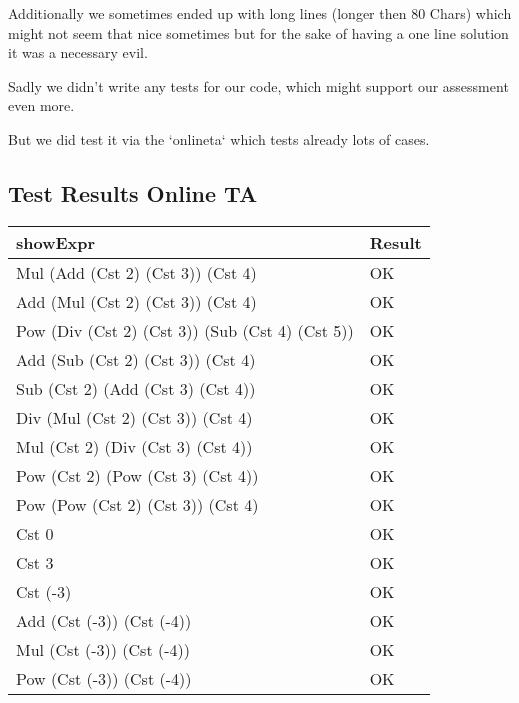 \documentclass[12pt,a4paper]{article}
\begin{document}
Additionally we sometimes ended up with long lines (longer then 80 Chars) which might not seem that nice sometimes but for the sake of having a one line solution it was a necessary evil.

Sadly we didn't write any tests for our code, which might support our assessment even more.

But we did test it via the `onlineta` which tests already lots of cases.

\subsection{Test Results Online TA}
\begin{tabularx}{\textwidth}[!htbp]{X|l}
 \textbf{showExpr} & Result \\
 \hline
   Mul (Add (Cst 2) (Cst 3)) (Cst 4) & OK \\
   \hline
    Add (Mul (Cst 2) (Cst 3)) (Cst 4) & OK \\
    Pow (Div (Cst 2) (Cst 3)) (Sub (Cst 4) (Cst 5)) & OK \\
    \hline
    Add (Sub (Cst 2) (Cst 3)) (Cst 4) & OK \\
    \hline
    Sub (Cst 2) (Add (Cst 3) (Cst 4)) & OK \\
    \hline
    Div (Mul (Cst 2) (Cst 3)) (Cst 4) & OK \\
    \hline
    Mul (Cst 2) (Div (Cst 3) (Cst 4)) & OK \\
    \hline
    Pow (Cst 2) (Pow (Cst 3) (Cst 4))& OK \\
    \hline
    Pow (Pow (Cst 2) (Cst 3)) (Cst 4)& OK \\
    \hline
    Cst 0 & OK \\
    \hline
    Cst 3 & OK \\
    \hline
    Cst (-3) & OK \\
    \hline
    Add (Cst (-3)) (Cst (-4)) & OK \\
    \hline
    Mul (Cst (-3)) (Cst (-4)) & OK \\
    \hline
    Pow (Cst (-3)) (Cst (-4)) & OK \\
     \hline
\end{tabularx}
\end{document}

